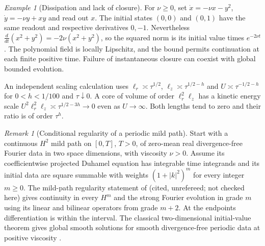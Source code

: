 \documentclass[aps,pra,onecolumn,superscriptaddress,nofootinbib,10pt]{revtex4-2}
\theoremstyle{definition}
\theoremstyle{remark}
\newtheorem{remark}[theorem]{Remark}
\newtheorem{example}[theorem]{Example}
\begin{document}
\begin{example}[Dissipation and lack of closure]
\label{ob:dissipativecounter}
For $\nu\ge0$, set
$\dot x=-\nu x-y^2$, $\dot y=-\nu y+xy$ and read out $x$.
The initial states $(0,0)$ and $(0,1)$ have the same readout and
respective derivatives $0,-1$. Nevertheless
$\tfrac{d}{dt}(x^2+y^2)=-2\nu(x^2+y^2)$, so the squared norm is its
initial value times $e^{-2\nu t}$. The polynomial field is locally
Lipschitz, and the bound permits continuation at each finite positive
time. Failure of instantaneous closure can coexist with global bounded
evolution.

An independent scaling calculation uses
$\ell_r\asymp\tau^{1/2}$, $\ell_z\asymp\tau^{1/2-h}$ and
$U\asymp\tau^{-1/2-h}$ for $0<h<1/100$ and $\tau\downarrow0$.
A core of volume of order $\ell_r^2\ell_z$ has a kinetic energy scale
$U^2\ell_r^2\ell_z\asymp\tau^{1/2-3h}\to0$ even as $U\to\infty$.
Both lengths tend to zero and their ratio is of order $\tau^h$.
\end{example}

\begin{remark}[Conditional regularity of a periodic mild path]
\label{ob:fluidmild}
Start with a continuous $H^2$ mild path on $[0,T]$, $T>0$, of zero-mean
real divergence-free Fourier data in two space dimensions, with viscosity
$\nu>0$. Assume its coefficientwise projected Duhamel equation
has integrable time integrands and its initial data are square summable
with weights $(1+|k|^2)^m$ for every integer $m\ge0$. The mild-path
regularity statement of \cite{obr:MildPath} (cited, unrefereed; not checked here) gives continuity in every $H^m$ and the strong
Fourier evolution in grade $m$ using its linear and bilinear operators
from grade $m+2$. At the endpoints differentiation is within the interval.
The classical two-dimensional initial-value theorem gives global smooth
solutions for smooth divergence-free periodic data at positive viscosity
\cite{obr:Ladyzhenskaya}.
\end{remark}
\end{document}
